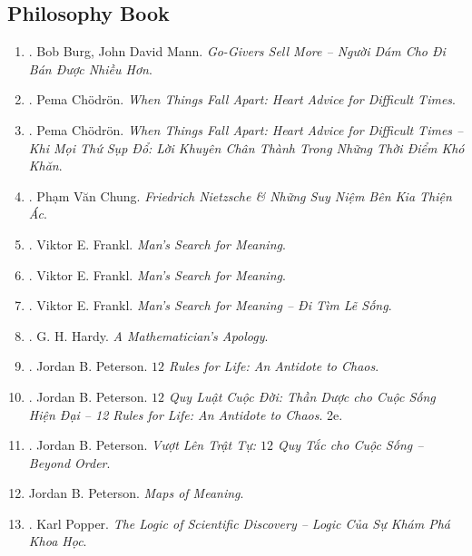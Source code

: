 \documentclass{article}
\begin{document}

\subsection{Philosophy Book}

\begin{enumerate}
	\item \cite{Burg_Mann_giver}. Bob Burg, John David Mann. {\it Go-Givers Sell More -- Người Dám Cho Đi Bán Được Nhiều Hơn}.\hfill{\sf[done]}
	\item \cite{Chodron2002}. Pema Ch\"odr\"on. {\it When Things Fall Apart: Heart Advice for Difficult Times}.\hfill{\sf[reading]}
	\item \cite{Chodron2021}. Pema Ch\"odr\"on. {\it When Things Fall Apart: Heart Advice for Difficult Times -- Khi Mọi Thứ Sụp Đổ: Lời Khuyên Chân Thành Trong Những Thời Điểm Khó Khăn}.\hfill{\sf[done]}
	\item \cite{Chung2022}. Phạm Văn Chung. {\it Friedrich Nietzsche \& Những Suy Niệm Bên Kia Thiện Ác}.\hfill{\sf[done]}
	\item \cite{Frankl_meaning}. Viktor E. Frankl. {\it Man's Search for Meaning}.\hfill{\sf[reading]}
	\item \cite{Frankl_meaning_revised}. Viktor E. Frankl. {\it Man's Search for Meaning}.\hfill{\sf[reading]}
	\item \cite{Frankl_meaning_VN}. Viktor E. Frankl. {\it Man's Search for Meaning -- Đi Tìm Lẽ Sống}.\hfill{\sf[done]}
	\item \cite{Hardy1940, Hardy1992, Hardy2022}. G. H. Hardy. {\it A Mathematician's Apology}.\hfill{\sf[done]}
	\item \cite{Peterson2018}. Jordan B. Peterson. {\it $12$ Rules for Life: An Antidote to Chaos}.\hfill{\sf[reading]}
	\item \cite{Peterson2022a}. Jordan B. Peterson. {\it $12$ Quy Luật Cuộc Đời: Thần Dược cho Cuộc Sống Hiện Đại -- 12 Rules for Life: An Antidote to Chaos}. 2e.\hfill{\sf[done]}
	\item \cite{Peterson2022b}. Jordan B. Peterson. {\it Vượt Lên Trật Tự: $12$ Quy Tắc cho Cuộc Sống -- Beyond Order}.\hfill{\sf[done]}
	\item Jordan B. Peterson. {\it Maps of Meaning}.\hfill{\sf[reading]}
	\item \cite{Popper_logic_khoa_hoc}. Karl Popper. {\it The Logic of Scientific Discovery -- Logic Của Sự Khám Phá Khoa Học}.\hfill{\sf[reading]}

\end{enumerate}
\end{document}
